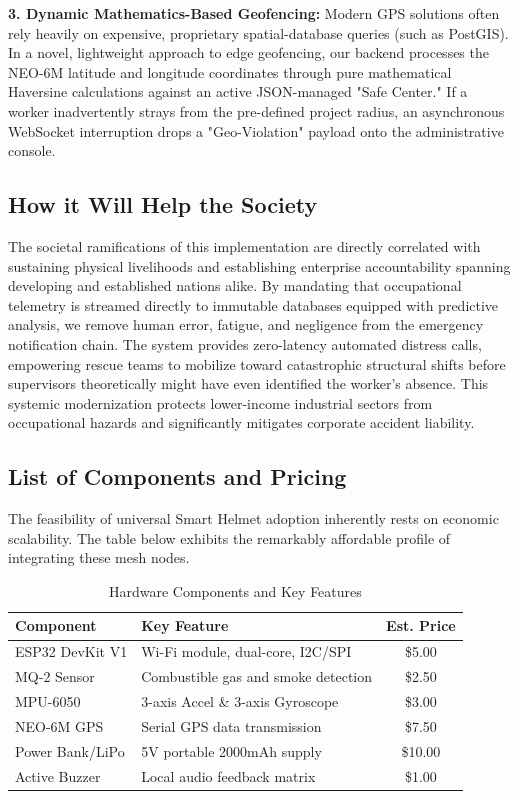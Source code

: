 \documentclass[11pt, conference, a4paper]{IEEEtran}
\begin{document}
\textbf{3. Dynamic Mathematics-Based Geofencing:} Modern GPS solutions often rely heavily on expensive, proprietary spatial-database queries (such as PostGIS). In a novel, lightweight approach to edge geofencing, our backend processes the NEO-6M latitude and longitude coordinates through pure mathematical Haversine calculations against an active JSON-managed "Safe Center." If a worker inadvertently strays from the pre-defined project radius, an asynchronous WebSocket interruption drops a "Geo-Violation" payload onto the administrative console.

\subsection{How it Will Help the Society}
The societal ramifications of this implementation are directly correlated with sustaining physical livelihoods and establishing enterprise accountability spanning developing and established nations alike. By mandating that occupational telemetry is streamed directly to immutable databases equipped with predictive analysis, we remove human error, fatigue, and negligence from the emergency notification chain. 
The system provides zero-latency automated distress calls, empowering rescue teams to mobilize toward catastrophic structural shifts before supervisors theoretically might have even identified the worker's absence. This systemic modernization protects lower-income industrial sectors from occupational hazards and significantly mitigates corporate accident liability.

\subsection{List of Components and Pricing}
The feasibility of universal Smart Helmet adoption inherently rests on economic scalability. The table below exhibits the remarkably affordable profile of integrating these mesh nodes.

\begin{table}[ht]
\centering
\caption{Hardware Components and Key Features}
\label{tab:components}
\begin{tabular}{|l|p{4cm}|c|}
\hline
\textbf{Component} & \textbf{Key Feature} & \textbf{Est. Price} \\ \hline
ESP32 DevKit V1 & Wi-Fi module, dual-core, I2C/SPI & \$5.00 \\ \hline
MQ-2 Sensor & Combustible gas and smoke detection & \$2.50 \\ \hline
MPU-6050 & 3-axis Accel \& 3-axis Gyroscope & \$3.00 \\ \hline
NEO-6M GPS & Serial GPS data transmission & \$7.50 \\ \hline
Power Bank/LiPo & 5V portable 2000mAh supply & \$10.00 \\ \hline
Active Buzzer& Local audio feedback matrix & \$1.00 \\ \hline
\end{tabular}
\end{table}
\end{document}
